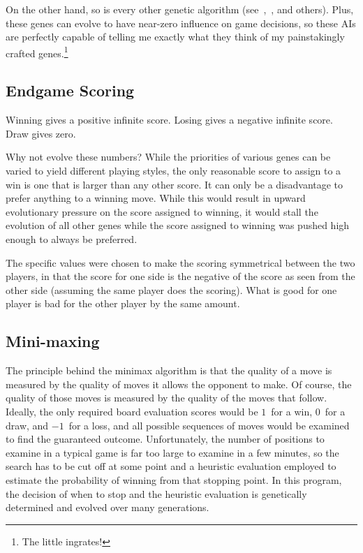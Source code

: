 \documentclass[letterpaper]{article}
\renewcommand{\_}{\allowbreak\textunderscore\allowbreak}
\begin{document}
On the other hand, so is every other genetic algorithm (see~\cite{evolved-antenna},~\cite{evolved-stellarator}, and others). Plus, these genes can evolve to have near-zero influence on game decisions, so these AIs are perfectly capable of telling me exactly what they think of my painstakingly crafted genes.\footnote{The little ingrates!}

\subsection{Endgame Scoring}

Winning gives a positive infinite score.
Losing gives a negative infinite score.
Draw gives zero.

Why not evolve these numbers? While the priorities of various genes can be varied to yield different playing styles, the only reasonable score to assign to a win is one that is larger than any other score. It can only be a disadvantage to prefer anything to a winning move. While this would result in upward evolutionary pressure on the score assigned to winning, it would stall the evolution of all other genes while the score assigned to winning was pushed high enough to always be preferred.

The specific values were chosen to make the scoring symmetrical between the two players, in that the score for one side is the negative of the score as seen from the other side (assuming the same player does the scoring). What is good for one player is bad for the other player by the same amount.

\subsection{Mini-maxing}\label{sec-minimax}

The principle behind the minimax algorithm is that the quality of a move is measured by the quality of moves it allows the opponent to make. Of course, the quality of those moves is measured by the quality of the moves that follow. Ideally, the only required board evaluation scores would be \(1\)~for a win, \(0\)~for a draw, and \(-1\)~for a loss, and all possible sequences of moves would be examined to find the guaranteed outcome. Unfortunately, the number of positions to examine in a typical game is far too large to examine in a few minutes, so the search has to be cut off at some point and a heuristic evaluation employed to estimate the probability of winning from that stopping point. In this program, the decision of when to stop and the heuristic evaluation is genetically determined and evolved over many generations.
\end{document}
